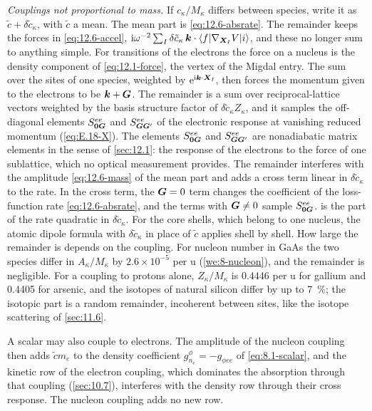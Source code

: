 \emph{Couplings not proportional to mass.} If $c_\kappa/M_\kappa$ differs between species, write it as $\tilde c + \delta\tilde c_\kappa$, with $\tilde c$ a mean. The mean part is \cref{eq:12.6-absrate}. The remainder keeps the forces in \cref{eq:12.6-accel}, $\mathrm{i}\omega^{-2}\sum_I\delta\tilde c_\kappa\,\bm{k}\cdot\langle f|\nabla_{\bm{X}_I}V|i\rangle$, and these no longer sum to anything simple. For transitions of the electrons the force on a nucleus is the density component of \cref{eq:12.1-force}, the vertex of the Migdal entry. The sum over the sites of one species, weighted by $\mathrm{e}^{\mathrm{i}\bm{k}\cdot\bm{X}_I}$, then forces the momentum given to the electrons to be $\bm{k} + \bm{G}$. The remainder is a sum over reciprocal-lattice vectors weighted by the basis structure factor of $\delta\tilde c_\kappa Z_\kappa$, and it samples the off-diagonal elements $S^{ee}_{\bm{0}\bm{G}}$ and $S^{ee}_{\bm{G}\bm{G}'}$ of the electronic response at vanishing reduced momentum (\cref{eq:E.18-X}). The elements $S^{ee}_{\bm{0}\bm{G}}$ and $S^{ee}_{\bm{G}\bm{G}'}$ are nonadiabatic matrix elements in the sense of \cref{sec:12.1}: the response of the electrons to the force of one sublattice, which no optical measurement provides. The remainder interferes with the amplitude \cref{eq:12.6-mass} of the mean part and adds a cross term linear in $\delta\tilde c_\kappa$ to the rate. In the cross term, the $\bm{G} = 0$ term changes the coefficient of the loss-function rate \cref{eq:12.6-absrate}, and the terms with $\bm{G} \neq 0$ sample $S^{ee}_{\bm{0}\bm{G}}$.  is the part of the rate quadratic in $\delta\tilde c_\kappa$. For the core shells, which belong to one nucleus, the atomic dipole formula with $\delta\tilde c_\kappa$ in place of $\tilde c$ applies shell by shell. How large the remainder is depends on the coupling. For nucleon number in GaAs the two species differ in $A_\kappa/M_\kappa$ by $2.6\times10^{-5}$ per u (\cref{we:8-nucleon}), and the remainder is negligible. For a coupling to protons alone, $Z_\kappa/M_\kappa$ is 0.4446 per u for gallium and 0.4405 for arsenic, and the isotopes of natural silicon differ by up to \SI{7}{\percent}; the isotopic part is a random remainder, incoherent between sites, like the isotope scattering of \cref{sec:11.6}.

A scalar may also couple to electrons. The amplitude of the nucleon coupling then adds $\tilde cm_e$ to the density coefficient $g^\phi_{n_e} = -g_{\phi ee}$ of \cref{eq:8.1-scalar}, and the kinetic row of the electron coupling, which dominates the absorption through that coupling (\cref{sec:10.7}), interferes with the density row through their cross response. The nucleon coupling adds no new row.


